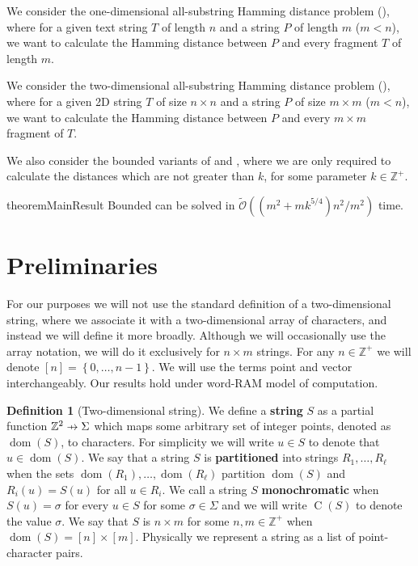 \documentclass[11pt]{article}
\newcommand{\Z}{\mathbb{Z}}
\newcommand{\tO}{\tilde{\mathcal{O}}}
\newcommand{\set}[1]{\left\lbrace #1 \right\rbrace}
\theoremstyle{plain}
\theoremstyle{definition}
\newtheorem{definition}{Definition}
\theoremstyle{remark}
\DeclareMathOperator*{\dom}{dom}
\DeclareMathOperator*{\charrr}{C}
\begin{document}
We consider the one-dimensional all-substring Hamming distance problem (\hd), where for a given text string $T$ of length $n$ and a string $P$ of length $m$ ($m < n$), we want to calculate the Hamming distance between $P$ and every fragment $T$ of length $m$.

We consider the two-dimensional all-substring Hamming distance problem (\HD), where for a given 2D string $T$ of size $n \times n$ and a string $P$ of size $m \times m$ ($m < n$), we want to calculate the Hamming distance between $P$ and every $m \times m$ fragment of $T$.

We also consider the bounded variants of \hd and \HD, where we are only required to calculate the distances which are not greater than $k$, for some parameter $k \in \Z^+$.

\begin{restatable*}{theorem}{MainResult}
	\label{main result}
	Bounded \HD can be solved in $\tO((m^2 + mk^{5/4})n^2 / m^2)$ time.
\end{restatable*}


\section{Preliminaries}

For our purposes we will not use the standard definition of a two-dimensional string, where we associate it with a two-dimensional array of characters, and instead we will define it more broadly.
Although we will occasionally use the array notation, we will do it exclusively for $n \times m$ strings.
For any $n \in \Z^+$ we will denote $[n] = \set{0, \dots, n - 1}$.
We will use the terms point and vector interchangeably.
Our results hold under word-RAM model of computation.

\newcommand{\getchar}[1]{\charrr(#1)}
\newcommand{\pto}{\mathrel{\ooalign{\hfil$\mapstochar\mkern5mu$\hfil\cr$\to$\cr}}}
\renewcommand{\d}[1]{\dom(#1)}
\newcommand{\f}[1]{#1^\mathbf{f}}
\begin{definition}[Two-dimensional string]
	We define a \textbf{string} $S$ as a partial function $\Z^2 \pto \Sigma$ which maps some arbitrary set of integer points, denoted as $\d{S}$, to characters.
	For simplicity we will write $u \in S$ to denote that $u \in \d{S}$.
	We say that a string $S$ is \textbf{partitioned} into strings $R_1, \dots, R_\ell$ when the sets $\d{R_1}, \dots, \d{R_\ell}$ partition $\d{S}$ and $R_i(u) = S(u)$ for all $u \in R_i$.
	We call a string $S$ \textbf{monochromatic} when $S(u) = \sigma$ for every $u \in S$ for some $\sigma \in \Sigma$ and we will write $\getchar{S}$ to denote the value $\sigma$.
	We say that $S$ is $n \times m$ for some $n, m \in \Z^+$ when $\d{S} = [n] \times [m]$.
	Physically we represent a string as a list of point-character pairs.
\end{definition}
\end{document}
